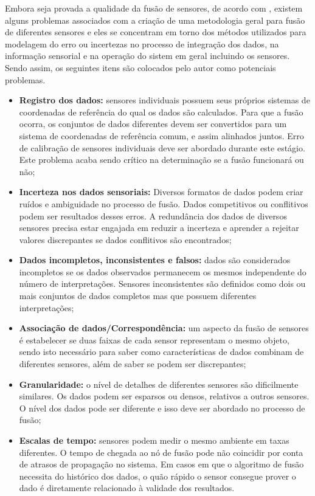 \documentclass[acronym, symbols, table, deposito]{fei}
\begin{document}
			Embora seja provada a qualidade da fusão de sensores, de acordo com \textcite{fung2017sensor}, existem alguns problemas associados com a criação de uma metodologia geral para fusão de diferentes sensores e eles se concentram em torno dos métodos utilizados para modelagem do erro ou incertezas no processo de integração dos dados, na informação sensorial e na operação do sistem em geral incluindo os sensores. Sendo assim, os seguintes itens são colocados pelo autor como potenciais problemas.
			
			\begin{itemize}
				\item \textbf{Registro dos dados:} sensores individuais possuem seus próprios sistemas de coordenadas de referência do qual os dados são calculados. Para que a fusão ocorra, os conjuntos de dados diferentes devem ser convertidos para um sistema de coordenadas de referência comum, e assim alinhados juntos. Erro de calibração de sensores individuais deve ser abordado durante este estágio. Este problema acaba sendo crítico na determinação se a fusão funcionará ou não;
				
				\item \textbf{Incerteza nos dados sensoriais:} Diversos formatos de dados podem criar ruídos e ambiguidade no processo de fusão. Dados competitivos ou conflitivos podem ser resultados desses erros. A redundância dos dados de diversos sensores precisa estar engajada em reduzir a incerteza e aprender a rejeitar valores discrepantes se dados conflitivos são encontrados;
				
				\item \textbf{Dados incompletos, inconsistentes e falsos:} dados são considerados incompletos se os dados observados permanecem os mesmos independente do número de interpretações. Sensores inconsistentes são definidos como dois ou mais conjuntos de dados completos mas que possuem diferentes interpretações;
				
				\item \textbf{Associação de dados/Correspondência:} um aspecto da fusão de sensores é estabelecer se duas faixas de cada sensor representam o mesmo objeto, sendo isto necessário para saber como características de dados combinam de diferentes sensores, além de saber se podem ser discrepantes;
				
				\item \textbf{Granularidade:} o nível de detalhes de diferentes sensores são dificilmente similares. Os dados podem ser esparsos ou densos, relativos a outros sensores. O nível dos dados pode ser diferente e isso deve ser abordado no processo de fusão;
				
				\item \textbf{Escalas de tempo:} sensores podem medir o mesmo ambiente em taxas diferentes. O tempo de chegada ao nó de fusão pode não coincidir por conta de atrasos de propagação no sistema. Em casos em que o algoritmo de fusão necessita do histórico dos dados, o quão rápido o sensor consegue prover o dado é diretamente relacionado à validade dos resultados.
			\end{itemize}
		
\end{document}
